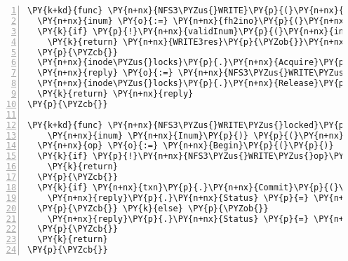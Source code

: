\begin{Verbatim}[commandchars=\\\{\},numbers=left,firstnumber=1,stepnumber=1,codes={\catcode`\$=3\catcode`\^=7\catcode`\_=8},fontsize=\small,numbersep=6pt,xleftmargin=0.2in]
\PY{k+kd}{func} \PY{n+nx}{NFS3\PYZus{}WRITE}\PY{p}{(}\PY{n+nx}{args} \PY{n+nx}{WRITE3args}\PY{p}{)} \PY{n+nx}{WRITE3res} \PY{p}{\PYZob{}}
  \PY{n+nx}{inum} \PY{o}{:=} \PY{n+nx}{fh2ino}\PY{p}{(}\PY{n+nx}{args}\PY{p}{.}\PY{n+nx}{File}\PY{p}{)}
  \PY{k}{if} \PY{p}{!}\PY{n+nx}{validInum}\PY{p}{(}\PY{n+nx}{inum}\PY{p}{)} \PY{p}{\PYZob{}}
    \PY{k}{return} \PY{n+nx}{WRITE3res}\PY{p}{\PYZob{}}\PY{n+nx}{Status}\PY{p}{:} \PY{n+nx}{NFS3ERR\PYZus{}INVAL}\PY{p}{\PYZcb{}}
  \PY{p}{\PYZcb{}}
  \PY{n+nx}{inode\PYZus{}locks}\PY{p}{.}\PY{n+nx}{Acquire}\PY{p}{(}\PY{n+nx}{inum}\PY{p}{)}
  \PY{n+nx}{reply} \PY{o}{:=} \PY{n+nx}{NFS3\PYZus{}WRITE\PYZus{}locked}\PY{p}{(}\PY{n+nx}{args}\PY{p}{,} \PY{n+nx}{inum}\PY{p}{)}
  \PY{n+nx}{inode\PYZus{}locks}\PY{p}{.}\PY{n+nx}{Release}\PY{p}{(}\PY{n+nx}{inum}\PY{p}{)}
  \PY{k}{return} \PY{n+nx}{reply}
\PY{p}{\PYZcb{}}

\PY{k+kd}{func} \PY{n+nx}{NFS3\PYZus{}WRITE\PYZus{}locked}\PY{p}{(}\PY{n+nx}{args} \PY{n+nx}{WRITE3args}\PY{p}{,}
    \PY{n+nx}{inum} \PY{n+nx}{Inum}\PY{p}{)} \PY{p}{(}\PY{n+nx}{reply} \PY{n+nx}{WRITE3res}\PY{p}{)} \PY{p}{\PYZob{}}
  \PY{n+nx}{op} \PY{o}{:=} \PY{n+nx}{Begin}\PY{p}{(}\PY{p}{)}
  \PY{k}{if} \PY{p}{!}\PY{n+nx}{NFS3\PYZus{}WRITE\PYZus{}op}\PY{p}{(}\PY{n+nx}{op}\PY{p}{,} \PY{n+nx}{args}\PY{p}{,} \PY{n+nx}{inum}\PY{p}{,} \PY{o}{\PYZam{}}\PY{n+nx}{reply}\PY{p}{)} \PY{p}{\PYZob{}}
    \PY{k}{return}
  \PY{p}{\PYZcb{}}
  \PY{k}{if} \PY{n+nx}{txn}\PY{p}{.}\PY{n+nx}{Commit}\PY{p}{(}\PY{k+kc}{true}\PY{p}{)} \PY{p}{\PYZob{}}
    \PY{n+nx}{reply}\PY{p}{.}\PY{n+nx}{Status} \PY{p}{=} \PY{n+nx}{NFS3\PYZus{}OK}
  \PY{p}{\PYZcb{}} \PY{k}{else} \PY{p}{\PYZob{}}
    \PY{n+nx}{reply}\PY{p}{.}\PY{n+nx}{Status} \PY{p}{=} \PY{n+nx}{NFS3ERR\PYZus{}SERVERFAULT}
  \PY{p}{\PYZcb{}}
  \PY{k}{return}
\PY{p}{\PYZcb{}}
\end{Verbatim}
